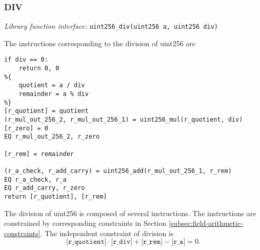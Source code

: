 \subsubsection{DIV}

\emph{Library function interface:} \verb|uint256_div(uint256 a, uint256 div)|

The instructions corresponding to the division of uint256 are
\begin{lstlisting}[language={}]
if div == 0:
    return 0, 0
%{
    quotient = a / div
    remainder = a % div
%}
[r_quotient] = quotient
(r_mul_out_256_2, r_mul_out_256_1) = uint256_mul(r_quotient, div)
[r_zero] = 0
EQ r_mul_out_256_2, r_zero

[r_rem] = remainder

(r_a_check, r_add_carry) = uint256_add(r_mul_out_256_1, r_rem)
EQ r_a_check, r_a
EQ r_add_carry, r_zero
return [r_quotient], [r_rem]
\end{lstlisting}

The division of uint256 is composed of several instructions. The instructions are constrained by corresponding constraints in Section \ref{subsec:field-arithmetic-constraints}. The independent constraint of division is
\[ \texttt{[r\_quotient]} \cdot \texttt{[r\_div]} + \texttt{[r\_rem]} - \texttt{[r\_a]} = 0. \]
